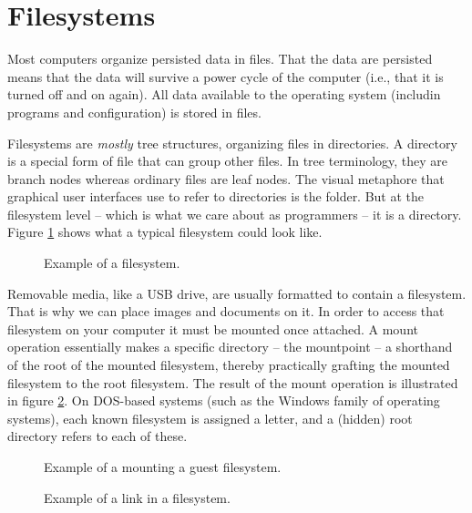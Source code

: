 \section{Filesystems}

Most computers organize persisted data in files. That the data are persisted means that the data will survive a power cycle of the computer (i.e., that it is turned off and on again). All data available to the operating system (includin programs and configuration) is stored in files.

Filesystems are \textsl{mostly} tree structures, organizing files in directories. A directory is a special form of file that can group other files. In tree terminology, they are branch nodes whereas ordinary files are leaf nodes. The visual metaphore that graphical user interfaces use to refer to directories is the folder. But at the filesystem level -- which is what we care about as programmers -- it is a directory. Figure \ref{fig:bs:fs} shows what a typical filesystem could look like.

\begin{figure}[tbp]
  
  \caption{Example of a filesystem.}
  \label{fig:bs:fs}
\end{figure}

Removable media, like a USB drive, are usually formatted to contain a filesystem. That is why we can place images and documents on it. In order to access that filesystem on your computer it must be mounted once attached. A mount operation essentially makes a specific directory -- the mountpoint -- a shorthand of the root of the mounted filesystem, thereby practically grafting the mounted filesystem to the root filesystem. The result of the mount operation is illustrated in figure \ref{fig:bs:fs:mounting}. On DOS-based systems (such as the Windows family of operating systems),
each known filesystem is assigned a letter, and a (hidden) root directory refers
to each of these.

\begin{figure}[tbp]
  
  \caption{Example of a mounting a guest filesystem.}
  \label{fig:bs:fs:mounting}
\end{figure}

\begin{figure}[tbp]
  
  \caption{Example of a link in a filesystem.}
  \label{fig:bs:fs:links}
\end{figure}

